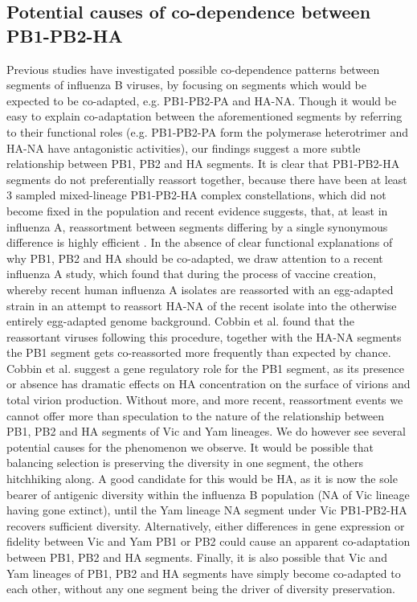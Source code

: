 \documentclass[11pt,oneside,letterpaper]{article}
\begin{document}
\subsection*{Potential causes of co-dependence between PB1-PB2-HA}
Previous studies have investigated possible co-dependence patterns between segments of influenza B viruses, by focusing on segments which would be expected to be co-adapted, e.g. PB1-PB2-PA and HA-NA.
Though it would be easy to explain co-adaptation between the aforementioned segments by referring to their functional roles (e.g. PB1-PB2-PA form the polymerase heterotrimer and HA-NA have antagonistic activities), our findings suggest a more subtle relationship between PB1, PB2 and HA segments.
It is clear that PB1-PB2-HA segments do not preferentially reassort together, because there have been at least 3 sampled mixed-lineage PB1-PB2-HA complex constellations, which did not become fixed in the population and recent evidence suggests, that, at least in influenza A, reassortment between segments differing by a single synonymous difference is highly efficient \cite{marshall2013}.
In the absence of clear functional explanations of why PB1, PB2 and HA should be co-adapted, we draw attention to a recent influenza A study, which found that during the process of vaccine creation, whereby recent human influenza A isolates are reassorted with an egg-adapted strain in an attempt to reassort HA-NA of the recent isolate into the otherwise entirely egg-adapted genome background.
Cobbin et al. \cite{cobbin2013} found that the reassortant viruses following this procedure, together with the HA-NA segments the PB1 segment gets co-reassorted more frequently than expected by chance.
Cobbin et al. suggest a gene regulatory role for the PB1 segment, as its presence or absence has dramatic effects on HA concentration on the surface of virions and total virion production.
Without more, and more recent, reassortment events we cannot offer more than speculation to the nature of the relationship between PB1, PB2 and HA segments of Vic and Yam lineages.
We do however see several potential causes for the phenomenon we observe.
It would be possible that balancing selection is preserving the diversity in one segment, the others hitchhiking along.
A good candidate for this would be HA, as it is now the sole bearer of antigenic diversity within the influenza B population (NA of Vic lineage having gone extinct), until the Yam lineage NA segment under Vic PB1-PB2-HA recovers sufficient diversity.
Alternatively, either differences in gene expression or fidelity between Vic and Yam PB1 or PB2 could cause an apparent co-adaptation between PB1, PB2 and HA segments.
Finally, it is also possible that Vic and Yam lineages of PB1, PB2 and HA segments have simply become co-adapted to each other, without any one segment being the driver of diversity preservation.
\end{document}
